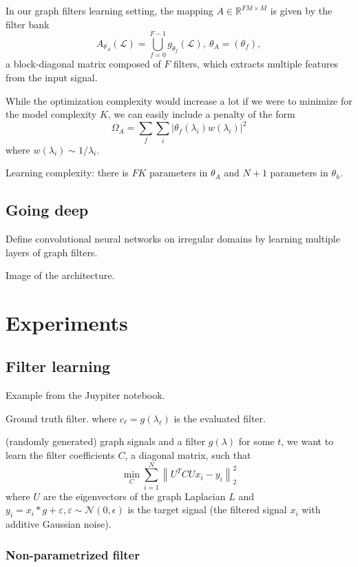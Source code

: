 \documentclass{article}
\renewcommand{\L}{\mathcal{L}}
\newcommand{\R}{\mathbb{R}}
\newcommand{\norm}[1]{\left\| #1 \right\|}
\begin{document}
In our graph filters learning setting, the mapping
\(A \in \R^{FM \times M}\) is given by the filter bank
\[ A_{\theta_A}(\L) = \bigcup_{f=0}^{F-1} g_{\theta_f}(\L),
\ \theta_A = (\theta_f), \] a block-diagonal matrix composed of \(F\)
filters, which extracts multiple features from the input signal.

While the optimization complexity would increase a lot if we were to
minimize for the model complexity \(K\), we can easily include a penalty
of the form
\[ \Omega_A = \sum_f \sum_i |\theta_f(\lambda_i) w(\lambda_i)|^2 \]
where \(w(\lambda_i) \sim 1 / \lambda_i\).

Learning complexity: there is \(FK\) parameters in \(\theta_A\) and
\(N+1\) parameters in \(\theta_h\).

\subsection{Going deep}\label{going-deep}

Define convolutional neural networks on irregular domains by learning
multiple layers of graph filters.

Image of the architecture.

\section{Experiments}\label{experiments}

\subsection{Filter learning}\label{filter-learning}

Example from the Juypiter notebook.

Ground truth filter. where \(c_\ell = g(\lambda_\ell)\) is the evaluated
filter.

(randomly generated) graph signals and a filter \(g(\lambda)\) for some
\(t\), we want to learn the filter coefficients \(C\), a diagonal
matrix, such that \[\min_C \sum_{i=1}^N \norm{ U^T C U x_i - y_i }_2^2\]
where \(U\) are the eigenvectors of the graph Laplacian \(L\) and
\(y_i = x_i * g + \varepsilon, \varepsilon \sim \mathcal{N}(0,\epsilon)\)
is the target signal (the filtered signal \(x_i\) with additive Gaussian
noise).

\subsubsection{Non-parametrized filter}\label{non-parametrized-filter}
\end{document}
